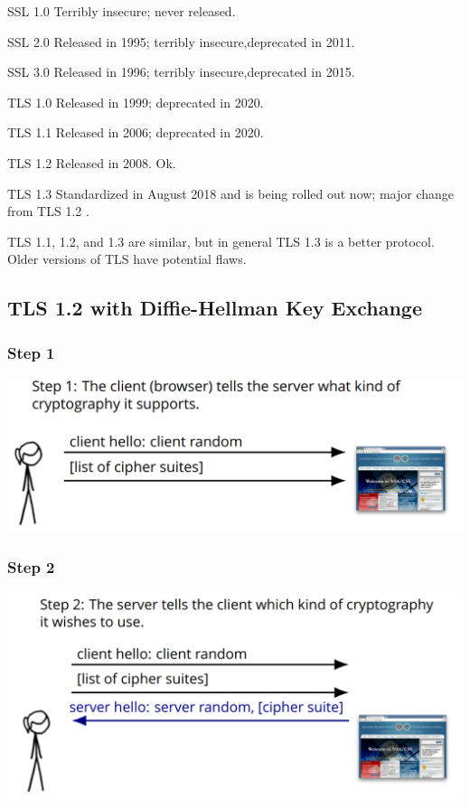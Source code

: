 \documentclass[11pt]{article} %
\begin{document}
\smallskip
{\parindent0pt SSL 1.0 Terribly insecure; never released.}

\smallskip
{\parindent0pt SSL 2.0 Released in 1995; terribly insecure,deprecated in 2011.}

\smallskip
{\parindent0pt SSL 3.0  Released in 1996; terribly insecure,deprecated in 2015.}

\smallskip
{\parindent0pt TLS 1.0 Released in 1999; deprecated in 2020.}

\smallskip
{\parindent0pt TLS 1.1 Released in 2006; deprecated in 2020.}

\smallskip
{\parindent0pt TLS 1.2 Released in 2008. Ok.}

\smallskip
{\parindent0pt TLS 1.3 Standardized in August 2018 and is being rolled out now;  major change from TLS 1.2 .

TLS 1.1, 1.2,  and 1.3 are similar, but in general TLS 1.3 is a better protocol. Older versions of TLS have potential flaws.

\subsection{TLS 1.2 with Diffie-Hellman Key Exchange}

\subsubsection{Step 1}
\begin{center}
	\includegraphics[scale=.5]{./DiffieStep1.png}
\end{center}

\subsubsection{Step 2}
\begin{center}
	\includegraphics[scale=.5]{./DiffieStep2.png}
\end{center}

}
\end{document}
